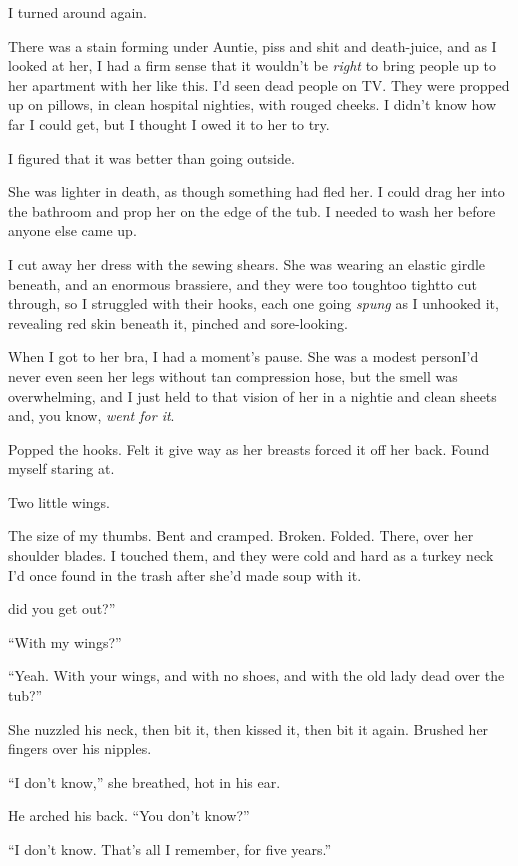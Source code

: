 I turned around again.

There was a stain forming under Auntie, piss and shit and death-juice,
and as I looked at her, I had a firm sense that it wouldn't be
\textit{right} to bring people up to her apartment with her like this. 
I'd seen dead people on TV.  They were propped up on pillows, in clean
hospital nighties, with rouged cheeks.  I didn't know how far I could
get, but I thought I owed it to her to try.

I figured that it was better than going outside.

She was lighter in death, as though something had fled her.  I could
drag her into the bathroom and prop her on the edge of the tub.  I
needed to wash her before anyone else came up.

I cut away her dress with the sewing shears.  She was wearing an
elastic girdle beneath, and an enormous brassiere, and they were too
tough\dash{}too tight\dash{}to cut through, so I struggled with their hooks,
each one going \textit{spung} as I unhooked it, revealing red skin
beneath it, pinched and sore-looking.

When I got to her bra, I had a moment's pause.  She was a modest
person\dash{}I'd never even seen her legs without tan compression hose,
but the smell was overwhelming, and I just held to that vision of her
in a nightie and clean sheets and, you know, \textit{went for it}.

Popped the hooks.  Felt it give way as her breasts forced it off her
back.  Found myself staring at.

Two little wings.

The size of my thumbs.  Bent and cramped.  Broken.  Folded.  There,
over her shoulder blades.  I touched them, and they were cold and hard
as a turkey neck I'd once found in the trash after she'd made soup
with it.

did you get out?''

``With my wings?''

``Yeah.  With your wings, and with no shoes, and with the old lady
dead over the tub?''

She nuzzled his neck, then bit it, then kissed it, then bit it again. 
Brushed her fingers over his nipples.

``I don't know,'' she breathed, hot in his ear.

He arched his back.  ``You don't know?''

``I don't know.  That's all I remember, for five years.''


